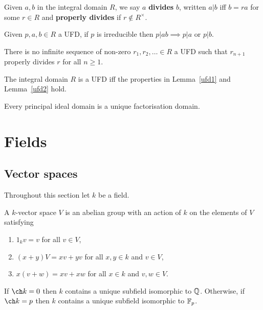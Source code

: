 \documentclass[../Year2.tex]{subfiles}
\begin{document}
\begin{definition}[Division]
    Given $a,b$ in the integral domain $R$, we say $a$ \textbf{divides} $b$, written $a|b$ iff $b=ra$ for some $r\in R$ and \textbf{properly divides} if $r\not\in R^\times$.
\end{definition}

\begin{lemma}\label{ufd1}
    Given $p,a,b\in R$ a UFD, if $p$ is irreducible then $p|ab\implies p|a$ or $p|b$.
\end{lemma}

\begin{lemma}\label{ufd2}
    There is no infinite sequence of non-zero $r_1,r_2,\ldots\in R$ a UFD such that $r_{n+1}$ properly divides $r$ for all $n\geq1$.
\end{lemma}

\begin{theorem}
    The integral domain $R$ is a UFD iff the properties in Lemma~\ref{ufd1} and Lemma~\ref{ufd2} hold.
\end{theorem}

\begin{theorem}
    Every principal ideal domain is a unique factorisation domain.
\end{theorem}

\section{Fields}

\subsection{Vector spaces}
Throughout this section let $k$ be a field.

\begin{definition}
    A $k$-vector space $V$ is an abelian group with an action of $k$ on the elements of $V$ satisfying \begin{enumerate}
        \item $1_k v=v$ for all $v\in V$,
        \item $(x+y)V = xv + yv$ for all $x,y\in k$ and $v\in V$,
        \item $x(v+w) = xv + xw$ for all $x\in k$ and $v,w\in V$.
    \end{enumerate}
\end{definition}

\begin{proposition}
    If $\ch k=0$ then $k$ contains a unique subfield isomorphic to $\mathbb{Q}$. Otherwise, if $\ch k = p$ then $k$ contains a unique subfield isomorphic to $\mathbb{F}_p$.
\end{proposition}
\end{document}
